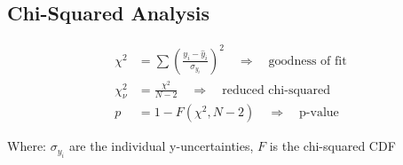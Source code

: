\documentclass{article} %
\begin{document}
\subsection*{Chi-Squared Analysis}
\begin{align*}
\chi^2 &= \sum \left(\frac{y_i - \hat{y}_i}{\sigma_{y_i}}\right)^2 \quad \Rightarrow \quad \text{goodness of fit} \\
\chi_\nu^2 &= \frac{\chi^2}{N-2} \quad \Rightarrow \quad \text{reduced chi-squared} \\
p &= 1 - F(\chi^2, N-2) \quad \Rightarrow \quad \text{p-value}
\end{align*}

Where: $\sigma_{y_i}$ are the individual y-uncertainties, $F$ is the chi-squared CDF
\end{document}
